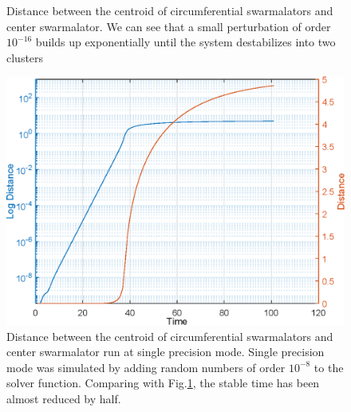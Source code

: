 \documentclass[twocolumn,10pt]{asme2ej}
\begin{document}
{\begin{figure}[h!]
        \caption{Distance between the centroid of circumferential swarmalators and center swarmalator. We can see that a small perturbation of order \(10^{-16}\) builds up exponentially until the system destabilizes into two clusters}
        \label{fig:centerDistVtime}
    \end{figure}
    \begin{figure}
        \includegraphics[width = \linewidth]{centerDistVtimeError.eps}
        \caption{Distance between the centroid of circumferential swarmalators and center swarmalator run at single precision mode. Single precision mode was simulated by adding random numbers of order \(10^{-8}\) to the solver function. Comparing with Fig.\ref*{fig:centerDistVtime}, the stable time has been almost reduced by half.}
        \label{fig:centerDistVtimeError}
    \end{figure}
}
\end{document}
